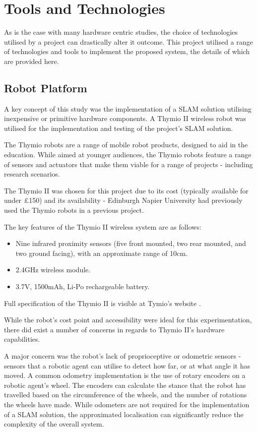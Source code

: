 \section{Tools and Technologies}
As is the case with many hardware centric studies, the choice of technologies
utilised by a project can drastically alter it outcome.
This project utilised a range of technologies and tools to implement the
proposed system, the details of which are provided here.

\subsection{Robot Platform}\label{tools_robot}
A key concept of this study was the implementation of a SLAM solution
utilising inexpensive or primitive hardware components.
A Thymio II wireless robot was utilised for the implementation and testing of
the project's SLAM solution.

The Thymio robots are a range of mobile robot products, designed to aid in the
education.
While aimed at younger audiences, the Thymio robots feature a range of
sensors and actuators that make them viable for a range of projects -
including research scenarios.

The Thymio II was chosen for this project due to its cost (typically available
for under £150) and its availability  - Edinburgh Napier University had
previously used the Thymio robots in a previous project.



The key features of the Thymio II wireless system are as follows:
\begin{itemize}
\item Nine infrared proximity sensors (five front mounted, two rear mounted,
and two ground facing), with an approximate range of 10cm.
\item 2.4GHz wireless module.
\item 3.7V, 1500mAh, Li-Po rechargeable battery.
\end{itemize}
Full specification of the Thymio II is visible at Tymio's website
\cite{thymio}.

While the robot's cost point and accessibility were ideal for this
experimentation, there did exist a number of concerns in regards to Thymio
II's hardware capabilities.

A major concern was the robot's lack of proprioceptive or odometric sensors -
sensors that a robotic agent can utilise to detect how far, or at what angle
it has moved.
A common odometry implementation is the use of rotary encoders on a robotic
agent's wheel.
The encoders can calculate the stance that the robot has travelled based on
the circumference of the wheels, and the number of rotations the wheels have
made.
While odometers are not required for the implementation of a SLAM solution, the
approximated localisation can significantly reduce the complexity of the
overall system.

